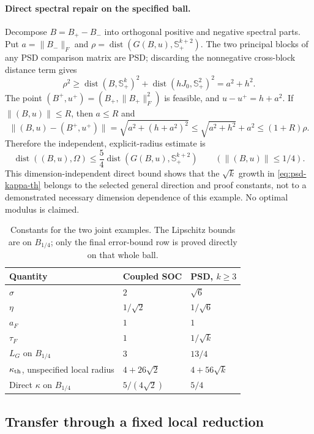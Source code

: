 \documentclass[11pt]{article}
\numberwithin{equation}{section}
\theoremstyle{definition}
\theoremstyle{remark}
\DeclareMathOperator{\dist}{dist}
\newcommand{\Ssym}{\mathbb S}
\newcommand{\norm}[1]{\lVert #1\rVert}
\newcommand{\dset}[2]{\dist(#1,#2)}
\begin{document}
\paragraph{Direct spectral repair on the specified ball.}
Decompose $B=B_+-B_-$ into orthogonal positive and negative spectral
parts. Put $a=\norm{B_-}_F$ and
$\rho=\dset{G(B,u)}{\Ssym_+^{k+2}}$.
The two principal blocks of any PSD comparison matrix are PSD; discarding
the nonnegative cross-block distance term gives
\[
 \rho^2\geq\dset{B}{\Ssym_+^k}^2
              +\dset{hJ_0}{\Ssym_+^2}^2=a^2+h^2.
\]
The point $(B^+,u^+)=(B_+,\norm{B_+}_F^2)$ is feasible, and
$u-u^+=h+a^2$. If $\norm{(B,u)}\leq R$, then $a\leq R$ and
\[
 \norm{(B,u)-(B^+,u^+)}
 =\sqrt{a^2+(h+a^2)^2}
 \leq\sqrt{a^2+h^2}+a^2\leq(1+R)\rho.
\]
Therefore the independent, explicit-radius estimate is
\begin{equation}
 \dset{(B,u)}{\Omega}\leq\frac54\dset{G(B,u)}{\Ssym_+^{k+2}}
 \qquad(\norm{(B,u)}\leq1/4).
 \label{eq:psd-direct}
\end{equation}
This dimension-independent direct bound shows that the $\sqrt k$
growth in \eqref{eq:psd-kappa-th} belongs to the selected general
direction and proof constants, not to a demonstrated necessary
dimension dependence of this example. No optimal modulus is claimed.

\begin{table}[t]
\centering\small
\caption{Constants for the two joint examples. The Lipschitz bounds are
on $B_{1/4}$; only the final error-bound row is proved directly on that whole ball.}
\label{tab:constants}
\begin{tabular}{@{}lll@{}}
\toprule
Quantity & Coupled SOC & PSD, $k\geq3$\\
\midrule
$\sigma$ & $2$ & $\sqrt6$\\
$\eta$ & $1/\sqrt2$ & $1/\sqrt6$\\
$a_F$ & $1$ & $1$\\
$\tau_F$ & $1$ & $1/\sqrt k$\\
$L_G$ on $B_{1/4}$ & $3$ & $13/4$\\
$\kappa_{\rm th}$, unspecified local radius & $4+26\sqrt2$ & $4+56\sqrt k$\\
Direct $\kappa$ on $B_{1/4}$ & $5/(4\sqrt2)$ & $5/4$\\
\bottomrule
\end{tabular}
\end{table}

\subsection{Transfer through a fixed local reduction}
\label{subsec:reduction}
\end{document}
